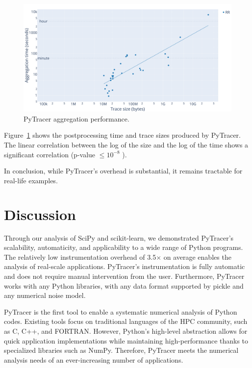 \documentclass[10pt,journal,compsoc]{IEEEtran}
\newcommand{\pytracer}[0]{PyTracer\xspace}
\DeclareRobustCommand{\remove}[1]{}
\DeclareRobustCommand{\remove}[1]{}
\begin{document}
\begin{figure}
    \centering
    \includegraphics[width=\linewidth]{figure/performance_parsing.pdf}
    \caption{\pytracer aggregation performance.
    }
    \label{fig:performance_parsing}
\end{figure}

Figure~\ref{fig:performance_parsing} shows the postprocessing time and trace
sizes produced by \pytracer. The linear correlation between the log of the size
and the log of the time shows a significant correlation (p-value $\leq 10^{-8}$
\remove{for RR and p-value $\leq 10^{-3}$ for MCA}).

In conclusion, while \pytracer's overhead is substantial, it remains tractable
for real-life examples.

\section{Discussion}

Through our analysis of SciPy and scikit-learn, we demonstrated \pytracer's
scalability, automaticity, and applicability to a wide range of Python programs.
The relatively low instrumentation overhead of 3.5$\times$ on average enables
the analysis of real-scale applications. \pytracer's instrumentation is fully
automatic and does not require manual intervention from the user. Furthermore,
\pytracer works with any Python libraries, with any data format supported by
pickle and any numerical noise model.

\pytracer is the first tool to enable a systematic numerical analysis of Python
codes. Existing tools focus on traditional languages of the HPC community, such
as C, C++, and FORTRAN. However, Python's high-level abstraction allows for
quick application implementations while maintaining high-performance thanks to
specialized libraries such as NumPy. Therefore, \pytracer meets the numerical
analysis needs of an ever-increasing number of applications.
\end{document}
